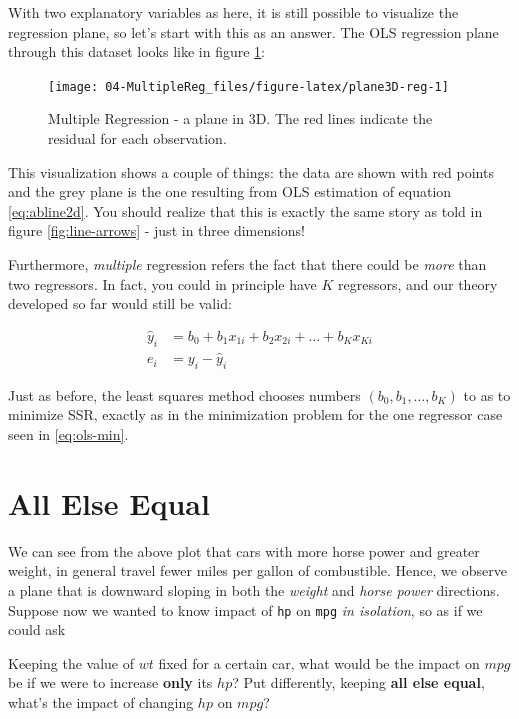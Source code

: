 \documentclass[]{book}
\newenvironment{tip}{\begin{tcolorbox}[colback=green!5!white,colframe=green]}{\end{tcolorbox}}
\begin{document}
With two explanatory variables as here, it is still possible to
visualize the regression plane, so let's start with this as an answer.
The OLS regression plane through this dataset looks like in figure
\ref{fig:plane3D-reg}:

\begin{figure}

{\centering \texttt{[image: 04-MultipleReg\_files/figure-latex/plane3D-reg-1]} 

}

\caption{Multiple Regression - a plane in 3D. The red lines indicate the residual for each observation.}\label{fig:plane3D-reg}
\end{figure}

This visualization shows a couple of things: the data are shown with red
points and the grey plane is the one resulting from OLS estimation of
equation \eqref{eq:abline2d}. You should realize that this is exactly the
same story as told in figure \ref{fig:line-arrows} - just in three
dimensions!

Furthermore, \emph{multiple} regression refers the fact that there could
be \emph{more} than two regressors. In fact, you could in principle have
\(K\) regressors, and our theory developed so far would still be valid:

\begin{align}
\hat{y}_i &= b_0 + b_1 x_{1i} +   b_2 x_{2i} + \dots + b_K x_{Ki}\\
e_i &= y_i - \hat{y}_i \label{eq:multiple-reg}
\end{align}

Just as before, the least squares method chooses numbers
\((b_0,b_1,\dots,b_K)\) to as to minimize SSR, exactly as in the
minimization problem for the one regressor case seen in
\eqref{eq:ols-min}.

\section{All Else Equal}\label{ceteris}

We can see from the above plot that cars with more horse power and
greater weight, in general travel fewer miles per gallon of combustible.
Hence, we observe a plane that is downward sloping in both the
\emph{weight} and \emph{horse power} directions. Suppose now we wanted
to know impact of \texttt{hp} on \texttt{mpg} \emph{in isolation}, so as
if we could ask

\begin{tip}
Keeping the value of \(wt\) fixed for a certain car, what would be the
impact on \(mpg\) be if we were to increase \textbf{only} its \(hp\)?
Put differently, keeping \textbf{all else equal}, what's the impact of
changing \(hp\) on \(mpg\)?
\end{tip}
\end{document}
